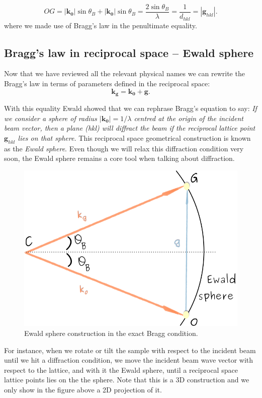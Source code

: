 \begin{equation*}
OG = |\mathbf{k_0}|\sin{\theta_B} + |\mathbf{k_0}|\sin{\theta_B} =\frac{2\sin{\theta_B}}{\lambda}=\frac{1}{d_{hkl}}=|\mathbf{g}_{hkl}|.
\end{equation*}
where we made use of Bragg's law in the penultimate equality.




\subsection{Bragg's law in reciprocal space -- Ewald sphere}
\label{sec:Ewald}
Now that we have reviewed  all the relevant physical names we can rewrite the Bragg's law in terms of parameters defined in the reciprocal space:
\begin{equation}
\label{eq:Bragg1}
    \mathbf{k_g}=\mathbf{k_0}+\mathbf{g}.
\end{equation}

With this equality Ewald showed that we can rephrase Bragg's equation to say: \textit{If we consider a sphere of radius $|\mathbf{k_0}|=1/\lambda$ centred at the origin of the incident beam vector, then a plane \hkl(hkl) will diffract the beam if the reciprocal lattice point $\mathbf{g}_{hkl}$ lies on that sphere.} This reciprocal space geometrical construction is known as the \textit{Ewald sphere}.  Even though we will relax this diffraction condition very soon, the Ewald sphere remains a core tool when talking about diffraction. 

 \begin{figure}
    \centering
\includegraphics[width=0.52\linewidth]{Figures/EwaldSphere.png}
\caption{Ewald sphere construction in the exact Bragg condition. }
\label{Fig:Ewald}
\end{figure}

For instance, when we rotate or tilt the sample with respect to the incident beam until we hit a diffraction condition, we move the incident beam wave vector with respect to the lattice, and with it the Ewald sphere, until  a reciprocal space lattice points lies on the the sphere. Note that this is a 3D construction and we only show in the figure above a 2D projection of it.

